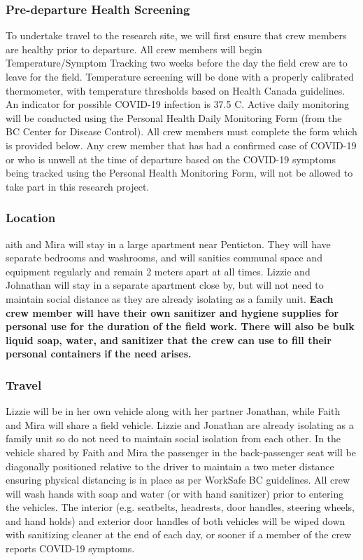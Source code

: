 \documentclass[11pt,letter]{article}
\begin{document}
\subsubsection {Pre-departure Health Screening}
To undertake travel to the research site, we will first ensure that crew members are healthy prior to departure. All crew members will begin Temperature/Symptom Tracking two weeks before the day the field crew are to leave for the field. Temperature screening will be done with a properly calibrated thermometer, with temperature thresholds based on Health Canada guidelines. An indicator for possible COVID-19 infection is 37.5 C. Active daily monitoring will be conducted using the Personal Health Daily Monitoring Form (from the BC Center for Disease Control). All crew members must complete the form which is provided below. Any crew member that has had a confirmed case of COVID-19 or who is unwell at the time of departure based on the COVID-19 symptoms being tracked using the Personal Health Monitoring Form, will not be allowed to take part in this research project.
   
\subsubsection{Location}
aith and Mira will stay in a large apartment near Penticton. They will have separate bedrooms and washrooms, and will sanities communal space and equipment regularly and remain 2 meters apart at all times. Lizzie and Johnathan will stay in a separate apartment close by, but will not need to maintain social distance as they are already isolating as a family unit. \textbf{Each crew member will have their own sanitizer and hygiene supplies for personal use for the duration of the field work. There will also be bulk liquid soap, water, and sanitizer that the crew can use to fill their personal containers if the need arises.}

\subsubsection {Travel}
Lizzie will be in her own vehicle along with her partner Jonathan, while Faith and Mira will share a field vehicle. Lizzie and Jonathan are already isolating as a family unit so do not need to maintain social isolation from each other. In the vehicle shared by Faith and Mira the passenger in the back-passenger seat will be diagonally positioned relative to the driver to maintain a two meter distance ensuring physical distancing is in place as per WorkSafe BC guidelines. All crew will wash hands with soap and water (or with hand sanitizer) prior to entering the vehicles. The interior (e.g. seatbelts, headrests, door handles, steering wheels, and hand holds) and exterior door handles of both vehicles will be wiped down with sanitizing cleaner at the end of each day, or sooner if a member of the crew reports COVID-19 symptoms.
\end{document}
